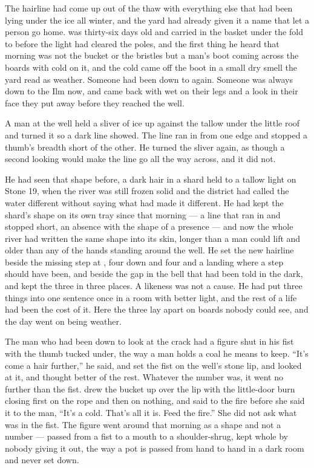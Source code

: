
The hairline had come up out of the thaw with everything else that had been lying under the ice all winter, and the yard had already given it a name that let a person go home.  was thirty-six days old and carried in the basket under the fold to  before the light had cleared the poles, and the first thing he heard that morning was not the bucket or the bristles but a man's boot coming across the boards with cold on it, and the cold came off the boot in a small dry smell the yard read as weather. Someone had been down to  again. Someone was always down to the Ilm now, and came back with wet on their legs and a look in their face they put away before they reached the well.

A man at the well held a sliver of ice up against the tallow under the little roof and turned it so a dark line showed. The line ran in from one edge and stopped a thumb's breadth short of the other. He turned the sliver again, as though a second looking would make the line go all the way across, and it did not.

He had seen that shape before, a dark hair in a shard held to a tallow light on Stone 19, when the river was still frozen solid and the district had called the water different without saying what had made it different. He had kept the shard's shape on its own tray since that morning --- a line that ran in and stopped short, an absence with the shape of a presence --- and now the whole river had written the same shape into its skin, longer than a man could lift and older than any of the hands standing around the well. He set the new hairline beside the missing step at , four down and four and a landing where a step should have been, and beside the gap in the bell that had been told in the dark, and kept the three in three places. A likeness was not a cause. He had put three things into one sentence once in a room with better light, and the rest of a life had been the cost of it. Here the three lay apart on boards nobody could see, and the day went on being weather.

The man who had been down to look at the crack had a figure shut in his fist with the thumb tucked under, the way a man holds a coal he means to keep. “It's come a hair further,” he said, and set the fist on the well's stone lip, and looked at it, and thought better of the rest. Whatever the number was, it went no further than the fist.  drew the bucket up over the lip with the little-door burn closing first on the rope and then on nothing, and said to the fire before she said it to the man, “It's a cold. That's all it is. Feed the fire.” She did not ask what was in the fist. The figure went around  that morning as a shape and not a number --- passed from a fist to a mouth to a shoulder-shrug, kept whole by nobody giving it out, the way a pot is passed from hand to hand in a dark room and never set down.

